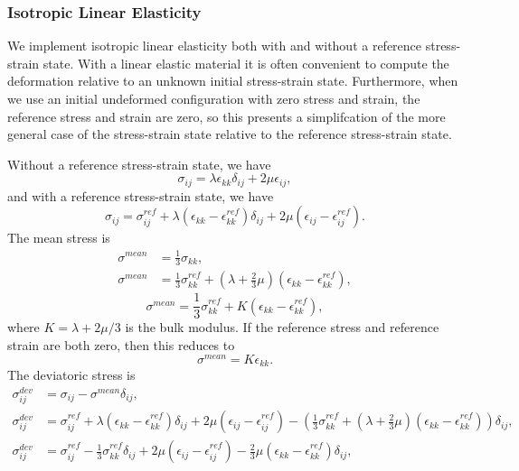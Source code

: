 \subsubsection{Isotropic Linear Elasticity}

We implement isotropic linear elasticity both with and without a
reference stress-strain state. With a linear elastic material it is
often convenient to compute the deformation relative to an unknown
initial stress-strain state. Furthermore, when we use an initial
undeformed configuration with zero stress and strain, the reference
stress and strain are zero, so this presents a simplifcation of the
more general case of the stress-strain state relative to the reference
stress-strain state.

Without a reference stress-strain state, we have
\begin{equation}
  \sigma_{ij} = \lambda \epsilon_{kk} \delta_{ij} + 2\mu\epsilon_{ij},
\end{equation}
and with a reference stress-strain state, we have
\begin{equation}
  \sigma_{ij} = \sigma_{ij}^\mathit{ref} + \lambda \left(\epsilon_{kk} - \epsilon_{kk}
^\mathit{ref}\right)
\delta_{ij} + 2\mu\left(\epsilon_{ij}-\epsilon_{ij}^\mathit{ref}\right).
\end{equation}
The mean stress is
\begin{align}
  \sigma^\mathit{mean} &= \frac{1}{3} \sigma_{kk}, \\
  \sigma^\mathit{mean} &= \frac{1}{3} \sigma_{kk}^\mathit{ref} + \left(\lambda+\frac{2}
{3}\mu\right)
\left(\epsilon_{kk}-\epsilon_{kk}^\mathit{ref}\right),
\end{align}
\begin{equation}
  \boxed{
  \sigma^\mathit{mean} = \frac{1}{3} \sigma_{kk}^\mathit{ref} + K \left(\epsilon_{kk}-
\epsilon_{kk}^\mathit{ref}
\right),
}%
\end{equation}
where $K=\lambda+2\mu/3$ is the bulk modulus. 
If the reference stress and reference strain are both zero, then this reduces to
\begin{equation}
  \boxed{
  \sigma^\mathit{mean} = K \epsilon_{kk}.
}%
\end{equation}
The deviatoric stress is
\begin{align}
  \sigma_{ij}^\mathit{dev} &= \sigma_{ij} - \sigma^\mathit{mean}\delta_{ij}, \\
  \sigma_{ij}^\mathit{dev} &= \sigma_{ij}^\mathit{ref} + \lambda\left(\epsilon_{kk}-
\epsilon_{kk}^\mathit{ref}
\right)\delta_{ij} + 2\mu\left(\epsilon_{ij}-\epsilon_{ij}^\mathit{ref}\right) - 
\left(\frac{1}{3}\sigma_{kk}
^\mathit{ref} + \left(\lambda+\frac{2}{3}\mu\right)\left(\epsilon_{kk}-\epsilon_{kk}
^\mathit{ref}\right)\right)
\delta_{ij}, \\
  \sigma_{ij}^\mathit{dev} &= \sigma_{ij}^\mathit{ref} -\frac{1}{3}\sigma_{kk}^\mathit{ref}
\delta_{ij} + 
2\mu\left(\epsilon_{ij}-\epsilon_{ij}^\mathit{ref}\right) - \frac{2}{3}\mu\left(\epsilon_{kk}-
\epsilon_{kk}
^\mathit{ref}\right)\delta_{ij},
\end{align}
